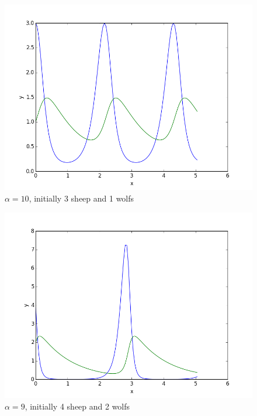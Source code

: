 \begin{figure}[!ht]
\includegraphics[width=1\textwidth]{chapters/images/figure-7-15-1}
\caption{$\alpha = 10$, initially 3 sheep and 1 wolfs}
\end{figure}

\begin{figure}[!ht]
\includegraphics[width=1\textwidth]{chapters/images/figure-7-15-2}
\caption{$\alpha = 9$, initially 4 sheep and 2 wolfs}
\end{figure}

